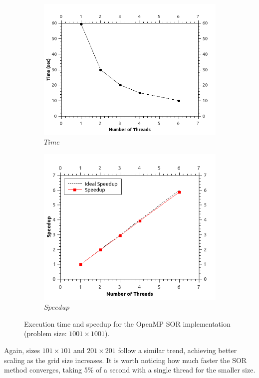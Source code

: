 \documentclass[11pt]{report}
\begin{document}
\begin{figure}[th!]
\centering
\begin{subfigure}{0.45\textwidth}
  \centering
  \includegraphics[width=0.8\linewidth]{images/sor_time_1001}
  \caption{$Time$}
\end{subfigure}
\begin{subfigure}{0.45\textwidth}
  \centering
  \includegraphics[width=0.8\linewidth]{images/sor_speedup_1001}
  \caption{$Speedup$}
\end{subfigure}
\caption{Execution time and speedup for the OpenMP SOR implementation (problem size: $1001 \times 1001$). }
\label{fig:example5.8}
\end{figure}

\newpage

Again, sizes $101 \times 101$ and $201 \times 201$ follow a similar trend, achieving better scaling as the grid size increases. It is worth noticing how much faster the SOR method converges, taking 5\% of a second with a single thread for the smaller size.
\newline
\end{document}
